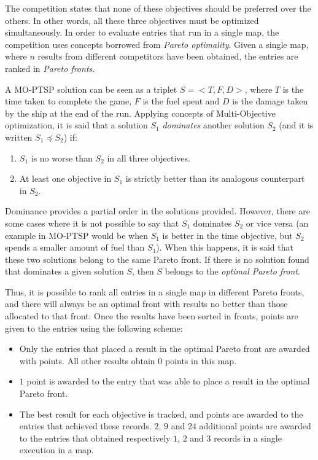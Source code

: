 \documentclass[conference]{IEEEtran}
\begin{document}
The competition states that none of these objectives should be preferred over the others. In other words, all these three objectives must be optimized simultaneously. In order to evaluate entries that run in a single map, the competition uses concepts borrowed from \textit{Pareto optimality}. Given a single map, where $n$ results from different competitors have been obtained, the entries are ranked in \textit{Pareto fronts}.

A MO-PTSP solution can be seen as a triplet $S = <T, F, D>$, where $T$ is the time taken to complete the game, $F$ is the fuel spent and $D$ is the damage taken by the ship at the end of the run. Applying concepts of Multi-Objective optimization, it is said that a solution $S_1$ \textit{dominates} another solution $S_2$ (and it is written $S_1 \preceq S_2$) if:

\begin{enumerate}
\item $S_1$ is no worse than $S_2$ in all three objectives.
\item At least one objective in $S_1$ is strictly better than its analogous counterpart in $S_2$.
\end{enumerate}

Dominance provides a partial order in the solutions provided. However, there are some cases where it is not possible to say that $S_1$ dominates $S_2$ or vice versa (an example in MO-PTSP would be when $S_1$ is better in the time objective, but $S_2$ spends a smaller amount of fuel than $S_1$). When this happens, it is said that these two solutions belong to the same Pareto front. If there is no solution found that dominates a given solution $S$, then $S$ belongs to the \textit{optimal Pareto front}.

Thus, it is possible to rank all entries in a single map in different Pareto fronts, and there will always be an optimal front with results no better than those allocated to that front. Once the results have been sorted in fronts, points are given to the entries using the following scheme:

\begin{itemize}
\item Only the entries that placed a result in the optimal Pareto front are awarded with points. All other results obtain $0$ points in this map.
\item $1$ point is awarded to the entry that was able to place a result in the optimal Pareto front.
\item The best result for each objective is tracked, and points are awarded to the entries that achieved these records. $2$, $9$ and $24$ additional points are awarded to the entries that obtained respectively $1$, $2$ and $3$ records in a single execution in a map.
\end{itemize}
\end{document}
